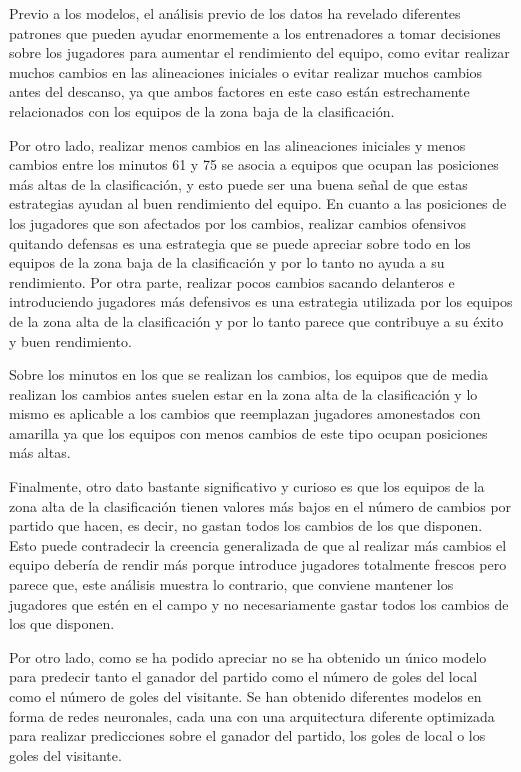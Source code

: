 Previo a los modelos, el análisis previo de los datos ha revelado diferentes patrones que pueden 
ayudar enormemente a los entrenadores a tomar decisiones sobre los jugadores para aumentar el 
rendimiento del equipo, como evitar realizar muchos cambios en las alineaciones iniciales o evitar 
realizar muchos cambios antes del descanso, ya que ambos factores en este caso están 
estrechamente relacionados con los equipos de la zona baja de la clasificación. 

Por otro lado, realizar menos cambios en las alineaciones iniciales y menos cambios entre los 
minutos 61 y 75 se asocia a equipos que ocupan las posiciones más altas de la clasificación, y esto 
puede ser una buena señal de que estas estrategias ayudan al buen rendimiento del equipo.
En cuanto a las posiciones de los jugadores que son afectados por los cambios, realizar cambios 
ofensivos quitando defensas es una estrategia que se puede apreciar sobre todo en los equipos de 
la zona baja de la clasificación y por lo tanto no ayuda a su rendimiento. Por otra parte, realizar 
pocos cambios sacando delanteros e introduciendo jugadores más defensivos es una estrategia 
utilizada por los equipos de la zona alta de la clasificación y por lo tanto parece que contribuye a 
su éxito y buen rendimiento.

Sobre los minutos en los que se realizan los cambios, los equipos que de media realizan los 
cambios antes suelen estar en la zona alta de la clasificación y lo mismo es aplicable a los cambios 
que reemplazan jugadores amonestados con amarilla ya que los equipos con menos cambios de 
este tipo ocupan posiciones más altas.

Finalmente, otro dato bastante significativo y curioso es que los equipos de la zona alta de la 
clasificación tienen valores más bajos en el número de cambios por partido que hacen, es decir, 
no gastan todos los cambios de los que disponen. Esto puede contradecir la creencia generalizada 
de que al realizar más cambios el equipo debería de rendir más porque introduce jugadores 
totalmente frescos pero parece que, este análisis muestra lo contrario, que conviene mantener los 
jugadores que estén en el campo y no necesariamente gastar todos los cambios de los que 
disponen.

Por otro lado, como se ha podido apreciar no se ha obtenido un único modelo para predecir tanto el ganador del partido como el número de goles del local como el número de goles del visitante. Se han obtenido diferentes modelos en forma de redes neuronales, cada una con una arquitectura diferente optimizada para realizar predicciones sobre el ganador del partido, los goles de local o los goles del visitante. 


